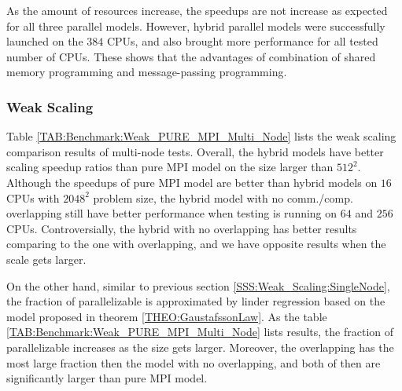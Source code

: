 As the amount of resources increase, the speedups are not increase as expected for all three parallel models.
However, hybrid parallel models were successfully launched on the $384$ CPUs, 
and also brought more performance for all tested number of CPUs.
These shows that the advantages of combination of shared memory programming and message-passing programming.

\subsubsection{Weak Scaling}



Table \ref{TAB:Benchmark:Weak_PURE_MPI_Multi_Node} lists the weak scaling comparison results of multi-node tests.
Overall, the hybrid models have better scaling speedup ratios than pure MPI model on the size larger than $512^2$.
Although the speedups of pure MPI model are better than hybrid models on $16$ CPUs with $2048^2$ problem size,
the hybrid model with no comm./comp. overlapping still have better performance when testing is running on $64$ and $256$ CPUs.
Controversially, the hybrid with no overlapping has better results comparing to the one with overlapping,
and we have opposite results when the scale gets larger.

On the other hand, similar to previous section \ref{SSS:Weak_Scaling:SingleNode}, the fraction of parallelizable is approximated by linder regression 
based on the model proposed in theorem \ref{THEO:GaustafssonLaw}.
As the table \ref{TAB:Benchmark:Weak_PURE_MPI_Multi_Node} lists results, the fraction of parallelizable increases as the size gets larger.
Moreover, the overlapping has the most large fraction then the model with no overlapping, and both of then are significantly larger than pure MPI model.

